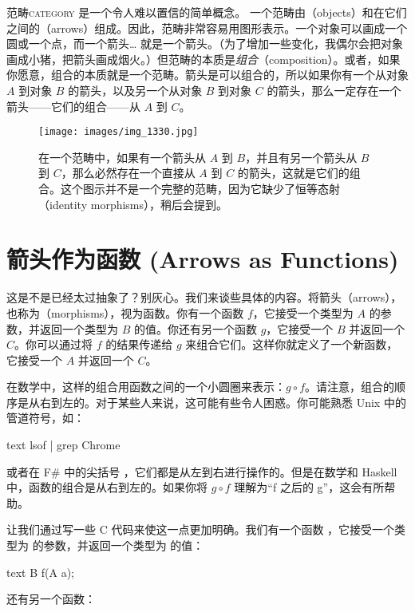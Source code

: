 
\lettrine[lhang=0.17]{范畴}{category} 是一个令人难以置信的简单概念。
一个范畴由（objects）和在它们之间的（arrows）组成。因此，范畴非常容易用图形表示。一个对象可以画成一个圆或一个点，而一个箭头\ldots{} 就是一个箭头。（为了增加一些变化，我偶尔会把对象画成小猪，把箭头画成烟火。）但范畴的本质是\emph{组合}（composition）。或者，如果你愿意，组合的本质就是一个范畴。箭头是可以组合的，所以如果你有一个从对象 $A$ 到对象 $B$ 的箭头，以及另一个从对象 $B$ 到对象 $C$ 的箭头，那么一定存在一个箭头——它们的组合——从 $A$ 到 $C$。

\begin{figure}
  \centering
  \texttt{[image: images/img\_1330.jpg]}
  \caption{在一个范畴中，如果有一个箭头从 $A$ 到 $B$，并且有另一个箭头从 $B$ 到 $C$，那么必然存在一个直接从 $A$ 到 $C$ 的箭头，这就是它们的组合。这个图示并不是一个完整的范畴，因为它缺少了恒等态射（identity morphisms），稍后会提到。}
\end{figure}

\section{箭头作为函数 (Arrows as Functions)}

这是不是已经太过抽象了？别灰心。我们来谈些具体的内容。将箭头（arrows），也称为（morphisms），视为函数。你有一个函数 $f$，它接受一个类型为 $A$ 的参数，并返回一个类型为 $B$ 的值。你还有另一个函数 $g$，它接受一个 $B$ 并返回一个 $C$。你可以通过将 $f$ 的结果传递给 $g$ 来组合它们。这样你就定义了一个新函数，它接受一个 $A$ 并返回一个 $C$。

在数学中，这样的组合用函数之间的一个小圆圈来表示：$g \circ f$。请注意，组合的顺序是从右到左的。对于某些人来说，这可能有些令人困惑。你可能熟悉 Unix 中的管道符号，如：

\begin{snip}{text}
  lsof | grep Chrome
\end{snip}
或者在 F\# 中的尖括号 \code{>>}，它们都是从左到右进行操作的。但是在数学和 Haskell 中，函数的组合是从右到左的。如果你将 $g \circ f$ 理解为“f 之后的 g”，这会有所帮助。

让我们通过写一些 C 代码来使这一点更加明确。我们有一个函数 ，它接受一个类型为  的参数，并返回一个类型为  的值：

\begin{snip}{text}
  B f(A a);
\end{snip}
还有另一个函数：

